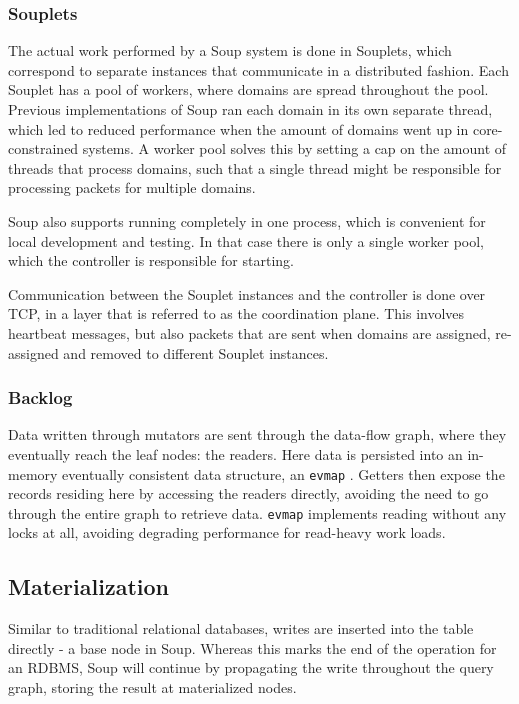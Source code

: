 \documentclass[b5paper]{report}
\begin{document}
\subsubsection{Souplets}
The actual work performed by a Soup system is done in Souplets, which
correspond to separate instances that communicate in a distributed fashion. Each
Souplet has a pool of workers, where domains are spread throughout the pool.
Previous implementations of Soup ran each domain in its own separate thread,
which led to reduced performance when the amount of domains went up in
core-constrained systems. A worker pool solves this by setting a cap on the
amount of threads that process domains, such that a single thread might be
responsible for processing packets for multiple domains.

Soup also supports running completely in one process, which is convenient for
local development and testing. In that case there is only a single worker pool,
which the controller is responsible for starting.

Communication between the Souplet instances and the controller is done over TCP,
in a layer that is referred to as the coordination plane. This involves
heartbeat messages, but also packets that are sent when domains are assigned,
re-assigned and removed to different Souplet instances.

\subsubsection{Backlog} \label{sec:readers}
Data written through mutators are sent through the data-flow graph, where they
eventually reach the leaf nodes: the readers. Here data is persisted into an
in-memory eventually consistent data structure, an \texttt{evmap} \cite{evmap}.
Getters then expose the records residing here by accessing the readers directly,
avoiding the need to go through the entire graph to retrieve data.
\texttt{evmap} implements reading without any locks at all, avoiding degrading
performance for read-heavy work loads.

\subsection{Materialization} \label{sec:materialization}
Similar to traditional relational databases, writes are inserted into the
table directly - a base node in Soup. Whereas this marks the end of the
operation for an RDBMS, Soup will continue by propagating the write throughout
the query graph, storing the result at materialized nodes.
\end{document}
